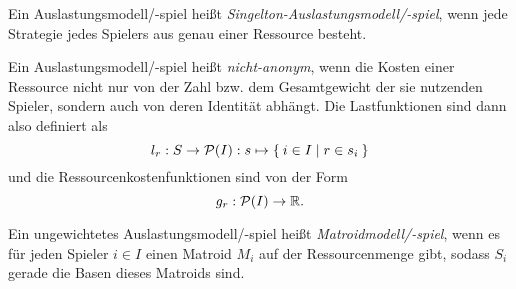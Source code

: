 \begin{defn}
	Ein Auslastungsmodell/-spiel heißt \emph{Singelton-Auslastungsmodell/-spiel}, wenn jede Strategie jedes Spielers aus genau einer Ressource besteht.
\end{defn}

\begin{defn}
	Ein Auslastungsmodell/-spiel heißt \emph{nicht-anonym}, wenn die Kosten einer Ressource nicht nur von der Zahl bzw. dem Gesamtgewicht der sie nutzenden Spieler, sondern auch von deren Identität abhängt. Die Lastfunktionen sind dann also definiert als
		\[l_r: S \to \mathcal{P}(I): s \mapsto \Set{i \in I | r \in s_i }\]
	und die Ressourcenkostenfunktionen sind von der Form
		\[g_r: \mathcal{P}(I) \to \mathbb{R}. \]
\end{defn}

\begin{defn}
	Ein ungewichtetes Auslastungsmodell/-spiel heißt \emph{Matroidmodell/-spiel}, wenn es für jeden Spieler $i \in I$ einen Matroid $M_i$ auf der Ressourcenmenge gibt, sodass $S_i$ gerade die Basen dieses Matroids sind.
\end{defn}